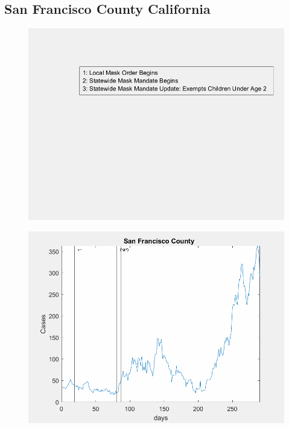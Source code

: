 \documentclass[12pt]{article}
\begin{document}
\FloatBarrier

\subsection[Subtitle]{\large San Francisco County California}

\begin{figure}[!h]
	\includegraphics[width=\linewidth]{legends/san_francisco_mask_order_legend.png}
	\caption{}
	\label{fig:legends/san_francisco_mask_order_legendLabel}
\end{figure}

\begin{figure}[!h]
	\includegraphics[width=\linewidth]{images/san_francisco_mask_order.png}
	\caption{}
	\label{fig:images/san_francisco_mask_orderLabel}
\end{figure}
\end{document}
